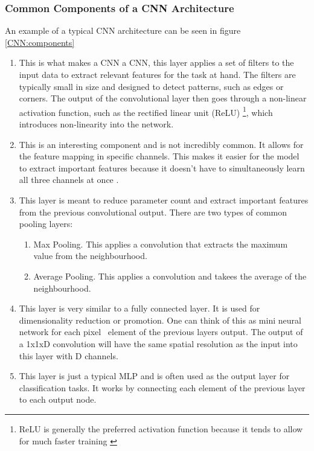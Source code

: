 \subsubsection*{Common Components of a CNN Architecture} \label{CNN:components}
An example of a typical CNN architecture can be seen in figure \ref{CNN:components}
\begin{enumerate}[align=left]
	\item[Convolutional Layer:] This is what makes a CNN a CNN, this layer applies a set of filters to the input data to extract relevant features for the task at hand. The filters are typically small in size and designed to detect patterns, such as edges or corners. The output of the convolutional layer then goes through a non-linear activation function, such as the rectified linear unit (ReLU) \footnote{ReLU is generally the preferred activation function because it tends to allow for much faster training \cite{krizhevsky2017imagenet}}, which introduces non-linearity into the network.
	\item[Deepthwise Convolutional Layer:] This is an interesting component and is not incredibly common. It allows for the feature mapping in specific channels. This makes it easier for the model to extract important features because it doesn't have to simultaneously learn all three channels at once \cite{chollet2017xception}.
	\item[Pooling Layer:] This layer is meant to reduce parameter count and extract important features from the previous convolutional output. There are two types of common pooling layers: \begin{enumerate}
		\item[1:] Max Pooling. This applies a convolution that extracts the maximum value from the neighbourhood.
		\item[2:] Average Pooling. This applies a convolution and takees the average of the neighbourhood.
	\end{enumerate}
	\item[1x1 Convolutional layer:] This layer is very similar to a fully connected layer. It is used for dimensionality reduction or promotion. One can think of this as mini neural network for each pixel \ element of the previous layers output. The output of a 1x1xD convolution will have the same spatial resolution as the input into this layer with D channels.
	\item[Fully Connected Layer:] This layer is just a typical MLP and is often used as the output layer for classification tasks. It works by connecting each element of the previous layer to each output node.
\end{enumerate}

